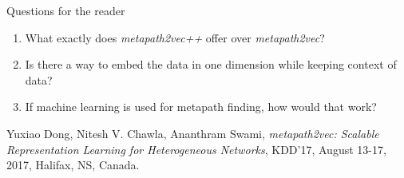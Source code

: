 \documentclass[12pt]{article}
\theoremstyle{remark}
\begin{document}
Questions for the reader
\begin{enumerate}
	\item What exactly does \textit{metapath2vec++} offer over \textit{metapath2vec}?
	\item Is there a way to embed the data in one dimension while keeping context of data?
	\item If machine learning is used for metapath finding, how would that work?
\end{enumerate}
\vspace{0.5cm}

\begin{thebibliography}{unsrt}
	Yuxiao Dong, Nitesh V. Chawla, Ananthram Swami, \emph{metapath2vec: Scalable Representation Learning for Heterogeneous Networks}, KDD’17, August 13-17, 2017, Halifax, NS, Canada.
\end{thebibliography}
\end{document}
